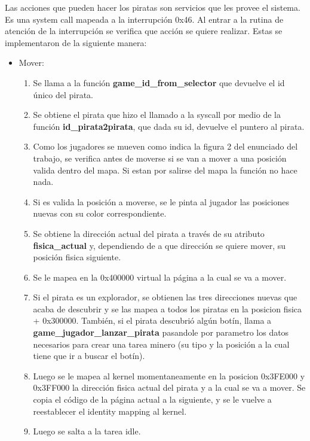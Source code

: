 \documentclass[a4paper,10pt]{article}
\begin{document}
  Las acciones que pueden hacer los piratas son servicios que les provee el sistema.
  Es una system call mapeada a la interrupción 0x46. Al entrar a la rutina de atención de la interrupción
  se verifica que acción se quiere realizar. Estas se implementaron de la siguiente manera:
  \begin{itemize}
    \item Mover:
      \begin{enumerate}
        \item Se llama a la función \textbf{game\_id\_from\_selector} que devuelve el id único del pirata.
        \item Se obtiene el pirata que hizo el llamado a la syscall por medio de la función \textbf{id\_pirata2pirata}, que dada
          su id, devuelve el puntero al pirata.
        \item Como los jugadores se mueven como indica la figura 2 del enunciado del trabajo, se verifica
          antes de moverse si se van a mover a una posición valida dentro del mapa. Si estan por salirse del mapa
          la función no hace nada.
        \item Si es valida la posición a moverse, se le pinta al jugador las posiciones nuevas con su color correspondiente.
        \item Se obtiene la dirección actual del pirata a través de su atributo \textbf{fisica\_actual} y,
          dependiendo de a que dirección se quiere mover, su posición fisica siguiente.
        \item Se le mapea en la 0x400000 virtual la página a la cual se va a mover.
        \item Si el pirata es un explorador, se obtienen las tres direcciones nuevas que acaba de descubrir
          y se las mapea a todos los piratas en la posicion fisica + 0x300000. También, si el pirata
          descubrió algún botín, llama a \textbf{game\_jugador\_lanzar\_pirata} pasandole por parametro
          los datos necesarios para crear una tarea minero (su tipo y la posición a la cual tiene que ir
          a buscar el botín).
        \item Luego se le mapea al kernel momentaneamente en la posicion 0x3FE000 y 0x3FF000 la dirección fisica actual
          del pirata y a la cual se va a mover. Se copia el código de la página actual a la siguiente, y
          se le vuelve a reestablecer el identity mapping al kernel.
        \item Luego se salta a la tarea idle.
      \end{enumerate}

\end{itemize}
\end{document}
